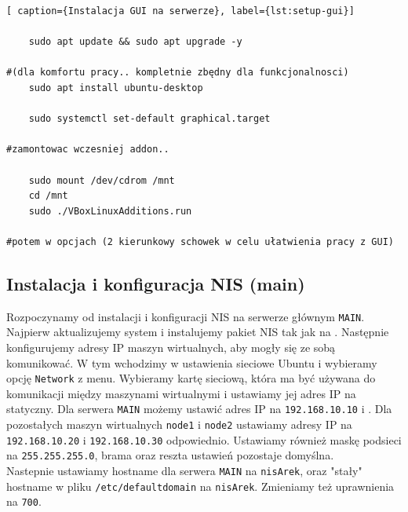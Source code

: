 	\begin{lstlisting}[ caption={Instalacja GUI na serwerze}, label={lst:setup-gui}]
	
	sudo apt update && sudo apt upgrade -y

#(dla komfortu pracy.. kompletnie zbędny dla funkcjonalnosci)
	sudo apt install ubuntu-desktop 

	sudo systemctl set-default graphical.target

#zamontowac wczesniej addon..

	sudo mount /dev/cdrom /mnt
	cd /mnt
	sudo ./VBoxLinuxAdditions.run

#potem w opcjach (2 kierunkowy schowek w celu ułatwienia pracy z GUI)
	\end{lstlisting}

\subsection{Instalacja i konfiguracja NIS (main)}
\label{sec:nis-installation}
Rozpoczynamy od instalacji i konfiguracji NIS na serwerze głównym \texttt{MAIN}.\\
Najpierw aktualizujemy system i instalujemy pakiet NIS tak jak na .
\clearpage
Następnie konfigurujemy adresy IP maszyn wirtualnych, aby mogły się ze sobą komunikować. W tym wchodzimy w ustawienia sieciowe Ubuntu i wybieramy opcję \texttt{Network} z menu. Wybieramy kartę sieciową, która ma być używana do komunikacji między maszynami wirtualnymi i ustawiamy jej adres IP na statyczny. Dla serwera \texttt{MAIN} możemy ustawić adres IP na \texttt{192.168.10.10}  i . Dla pozostałych maszyn wirtualnych \texttt{node1} i \texttt{node2} ustawiamy adresy IP na \texttt{192.168.10.20} i \texttt{192.168.10.30} odpowiednio. Ustawiamy również maskę podsieci na \texttt{255.255.255.0}, brama oraz reszta ustawień pozostaje domyślna.\\

\clearpage
{}
Nastepnie ustawiamy hostname dla serwera \texttt{MAIN} na \texttt{nisArek}, oraz "stały" hostname w pliku \texttt{/etc/defaultdomain} na \texttt{nisArek}. Zmieniamy też uprawnienia na \texttt{700}.\\


